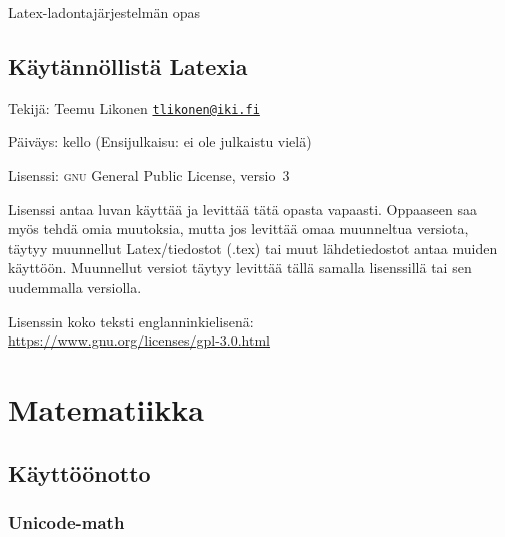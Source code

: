 \documentclass{book}
\newcommand{\angleemailurl}[1]
{\href{mailto:#1}{\guilsinglleft\nolinkurl{#1}\guilsinglright}}
\begin{document}
\vfill

{

  \raggedleft
  Latex-ladontajärjestelmän opas \\
  \DTMtoday

}

\clearpage
\restoregeometry
{}

\null\vfill

{
  \setlength{\parindent}{0em}
  \setlength{\parskip}{1.2ex plus .1ex}

  \section*{Käytännöllistä Latexia}

  Tekijä: Teemu Likonen \angleemailurl{tlikonen@iki.fi}

  Päiväys: \DTMtoday{} kello \DTMcurrenttime{} (Ensijulkaisu: ei ole
  julkaistu vielä)

  Lisenssi: \textenglish{\textsc{gnu} General Public License}, versio~3

  Lisenssi antaa luvan käyttää ja levittää tätä opasta vapaasti.
  Oppaaseen saa myös tehdä omia muutoksia, mutta jos levittää omaa
  muunneltua versiota, täytyy muunnellut Latex\-/tiedostot (.tex) tai
  muut lähdetiedostot antaa muiden käyttöön. Muunnellut versiot täytyy
  levittää tällä samalla lisenssillä tai sen uudemmalla versiolla.

  Lisenssin koko teksti englanninkielisenä: \\
  \url{https://www.gnu.org/licenses/gpl-3.0.html}

}

\cleardoublepage
\pagestyle{plain}

\tableofcontents

\cleardoublepage







\chapter{Matematiikka}
\label{luku:matematiikka}
\section{Käyttöönotto}
\subsection{Unicode-math}
\end{document}
